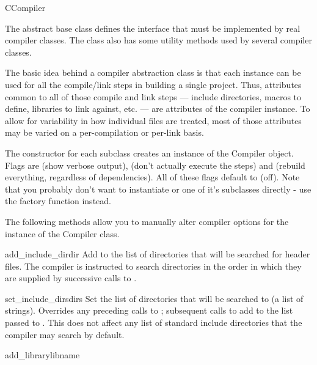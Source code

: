 \documentclass{manual}
\begin{document}
\begin{classdesc}{CCompiler}{}

The abstract base class  defines the interface that 
must be implemented by real compiler classes.  The class also has 
some utility methods used by several compiler classes.

The basic idea behind a compiler abstraction class is that each
instance can be used for all the compile/link steps in building a
single project.  Thus, attributes common to all of those compile and
link steps --- include directories, macros to define, libraries to link
against, etc. --- are attributes of the compiler instance.  To allow for
variability in how individual files are treated, most of those
attributes may be varied on a per-compilation or per-link basis.

The constructor for each subclass creates an instance of the Compiler
object. Flags are  (show verbose output), 
(don't actually execute the steps) and  (rebuild
everything, regardless of dependencies). All of these flags default to
 (off). Note that you probably don't want to instantiate
 or one of it's subclasses directly - use the
 factory function
instead.

The following methods allow you to manually alter compiler options for 
the instance of the Compiler class.

\begin{methoddesc}{add_include_dir}{dir}
Add  to the list of directories that will be searched for
header files.  The compiler is instructed to search directories in
the order in which they are supplied by successive calls to
.
\end{methoddesc}

\begin{methoddesc}{set_include_dirs}{dirs}
Set the list of directories that will be searched to  (a
list of strings).  Overrides any preceding calls to
; subsequent calls to
 add to the list passed to
.  This does not affect any list of
standard include directories that the compiler may search by default.
\end{methoddesc}

\begin{methoddesc}{add_library}{libname}


\end{methoddesc}
\end{classdesc}
\end{document}
